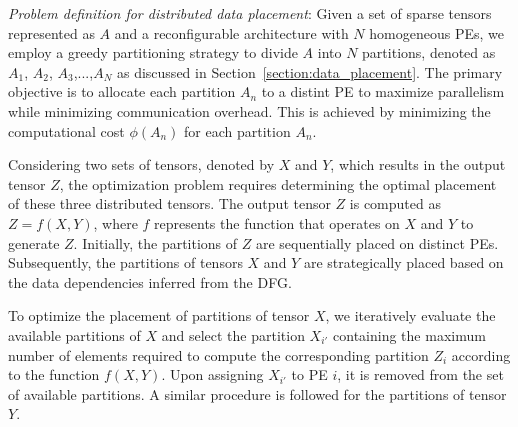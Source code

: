 {\textit{Problem definition for distributed data placement}:
Given a set of sparse tensors represented as $A$ and a reconfigurable architecture with $N$ homogeneous PEs, we employ a greedy partitioning strategy to divide $A$ into $N$ partitions, denoted as {$A_1$, $A_2$, $A_3$,...,$A_N$} as discussed in Section~\ref{section:data_placement}.
The primary objective is to allocate each partition $A_n$ to a distint PE to maximize parallelism while minimizing communication overhead. This is achieved by minimizing the computational cost $\phi(A_n)$ for each partition $A_n$.

Considering two sets of tensors, denoted by $X$ and $Y$, which results in the output tensor $Z$, the optimization problem requires determining the optimal placement of these three distributed tensors. 
The output tensor $Z$ is computed as $Z = f(X, Y)$, where $f$ represents the function that operates on $X$ and $Y$ to generate $Z$. 
Initially, the partitions of $Z$ are sequentially placed on distinct PEs. 
Subsequently, the partitions of tensors $X$ and $Y$ are strategically placed based on the data dependencies inferred from the DFG.

To optimize the placement of partitions of tensor $X$, we iteratively evaluate the available partitions of $X$ and select the partition $X_{i'}$ containing the maximum number of elements required to compute the corresponding partition $Z_i$ according to the function $f(X, Y)$. 
Upon assigning $X_{i'}$ to PE $i$, it is removed from the set of available partitions. 
A similar procedure is followed for the partitions of tensor $Y$.

}
